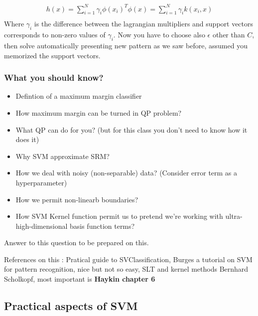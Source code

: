 \documentclass[12pt]{book}
\begin{document}
\begin{equation}
	\begin{aligned}
		h(x) = \sum_{i=1}^N \gamma_i \phi(x_i)^T\phi(x) = \sum_{i=1}^N \gamma_i k(x_i, x)\\
	\end{aligned}
\end{equation}
Where $\gamma_i$ is the difference between the lagrangian multipliers and support vectors corresponds to non-zero values of $\gamma_i$.\newline
Now you have to choose also $\epsilon$ other than $C$, then solve automatically presenting new pattern as we saw before, assumed you memorized the support vectors.

\subsubsection{What you should know?}
\begin{itemize}
	\item Defintion of a maximum margin classifier
	\item How maximum margin can be turned in QP problem?
	\item What QP can do for you? (but for this class you don't need to know how it does it)
	\item Why SVM approximate SRM?
	\item How we deal with noisy (non-separable) data? (Consider error term as a hyperparameter)
	\item How we permit non-linearb boundaries?
	\item How SVM Kernel function permit us to pretend we're working with ultra-high-dimensional basis function terms?
\end{itemize}

Answer to this question to be prepared on this.

References on this : Pratical guide to SVClassification, Burges a tutorial on SVM for pattern recognition, nice but not so easy, SLT and kernel methods Bernhard Scholkopf, most important is \textbf{Haykin chapter 6}

\subsection{Practical aspects of SVM}
\end{document}
